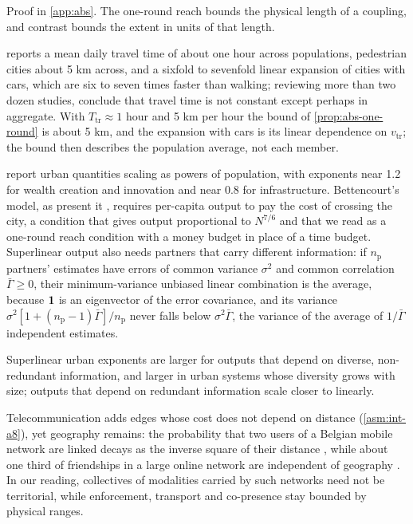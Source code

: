 Proof in \cref{app:abs}. The one-round reach bounds the physical length of a coupling, and contrast bounds the extent in units of that length.

\begin{remark}\label{rem:abs-marchetti}
\citet{marchetti1994anthropological} reports a mean daily travel time of about one hour across populations, pedestrian cities about 5 km across, and a sixfold to sevenfold linear expansion of cities with cars, which are six to seven times faster than walking; reviewing more than two dozen studies, \citet{mokhtarian2004ttb} conclude that travel time is not constant except perhaps in aggregate. With $T_{\mathrm{tr}}\approx1$ hour and 5 km per hour the bound of \cref{prop:abs-one-round} is about 5 km, and the expansion with cars is its linear dependence on $v_{\mathrm{tr}}$; the bound then describes the population average, not each member.
\end{remark}

\citet{bettencourt2007growth} report urban quantities scaling as powers of population, with exponents near 1.2 for wealth creation and innovation and near 0.8 for infrastructure. Bettencourt's model, as \citet{ribeiro2023mathematical} present it \citep{bettencourt2013origins}, requires per-capita output to pay the cost of crossing the city, a condition that gives output proportional to $N^{7/6}$ and that we read as a one-round reach condition with a money budget in place of a time budget. Superlinear output also needs partners that carry different information: if $n_{\mathrm p}$ partners' estimates have errors of common variance $\sigma^2$ and common correlation $\bar\Gamma\ge0$, their minimum-variance unbiased linear combination is the average, because $\mathbf{1}$ is an eigenvector of the error covariance, and its variance $\sigma^2[1+(n_{\mathrm p}-1)\bar\Gamma]/n_{\mathrm p}$ never falls below $\sigma^2\bar\Gamma$, the variance of the average of $1/\bar\Gamma$ independent estimates.

\begin{conjecture}\label{conj:abs-redundancy}
Superlinear urban exponents are larger for outputs that depend on diverse, non-redundant information, and larger in urban systems whose diversity grows with size; outputs that depend on redundant information scale closer to linearly.
\end{conjecture}

Telecommunication adds edges whose cost does not depend on distance (\cref{asm:int-a8}), yet geography remains: the probability that two users of a Belgian mobile network are linked decays as the inverse square of their distance \citep{lambiotte2008geographical}, while about one third of friendships in a large online network are independent of geography \citep{libennowell2005geographic}. In our reading, collectives of modalities carried by such networks need not be territorial, while enforcement, transport and co-presence stay bounded by physical ranges.

